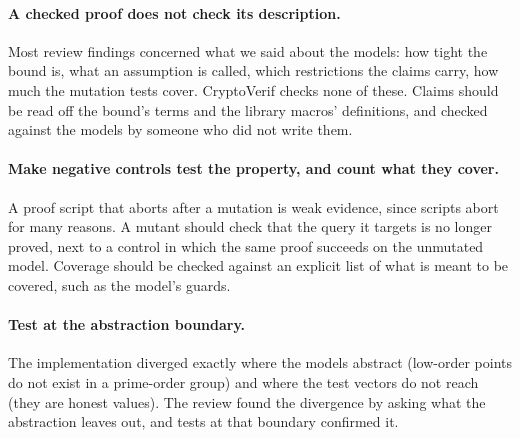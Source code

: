 \paragraph{A checked proof does not check its description.} Most review
findings concerned what we said about the models: how tight the bound is,
what an assumption is called, which restrictions the claims carry, how much
the mutation tests cover. CryptoVerif checks none of these. Claims should be
read off the bound's terms and the library macros' definitions, and checked
against the models by someone who did not write them.

\paragraph{Make negative controls test the property, and count what they
cover.} A proof script that aborts after a mutation is weak evidence, since
scripts abort for many reasons. A mutant should check that the query it
targets is no longer proved, next to a control in which the same proof
succeeds on the unmutated model. Coverage should be checked against an
explicit list of what is meant to be covered, such as the model's guards.

\paragraph{Test at the abstraction boundary.} The implementation diverged
exactly where the models abstract (low-order points do not exist in a
prime-order group) and where the test vectors do not reach (they are honest
values). The review found the divergence by asking what the abstraction
leaves out, and tests at that boundary confirmed it.

